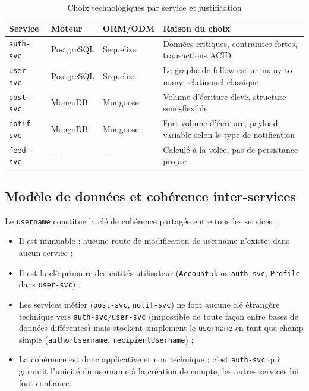 \documentclass{cesi}
\begin{document}
\begin{table}[H]
\centering
\begin{tabularx}{\linewidth}{l l l X}
\toprule
\textbf{Service} & \textbf{Moteur} & \textbf{ORM/ODM} & \textbf{Raison du choix} \\
\midrule
\texttt{auth-svc}  & PostgreSQL & Sequelize & Données critiques, contraintes fortes,
                                              transactions ACID \\
\texttt{user-svc}  & PostgreSQL & Sequelize & Le graphe de follow est un
                                              many-to-many relationnel classique \\
\texttt{post-svc}  & MongoDB    & Mongoose  & Volume d'écriture élevé, structure
                                              semi-flexible \\
\texttt{notif-svc} & MongoDB    & Mongoose  & Fort volume d'écriture, payload
                                              variable selon le type de notification \\
\texttt{feed-svc}  & ---        & ---       & Calculé à la volée, pas de
                                              persistance propre \\
\bottomrule
\end{tabularx}
\caption{Choix technologiques par service et justification}
\end{table}

\subsection{Modèle de données et cohérence inter-services}

Le \texttt{username} constitue la clé de cohérence partagée entre tous les
services :

\begin{itemize}
  \item Il est immuable : aucune route de modification de username n'existe,
        dans aucun service ;
  \item Il est la clé primaire des entités utilisateur (\texttt{Account}
        dans \texttt{auth-svc}, \texttt{Profile} dans \texttt{user-svc}) ;
  \item Les services métier (\texttt{post-svc}, \texttt{notif-svc}) ne font aucune
        clé étrangère technique vers \texttt{auth-svc}/\texttt{user-svc} (impossible
        de toute façon entre bases de données différentes) mais stockent simplement
        le \texttt{username} en tant que champ simple
        (\texttt{authorUsername}, \texttt{recipientUsername}) ;
  \item La cohérence est donc applicative et non technique : c'est
        \texttt{auth-svc} qui garantit l'unicité du username à la création de compte,
        les autres services lui font confiance.
\end{itemize}
\end{document}
